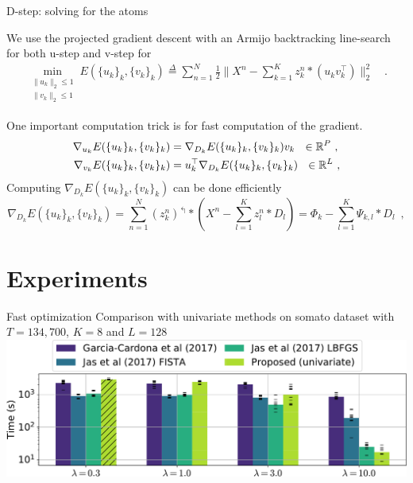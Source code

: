 \documentclass{beamer}
\begin{document}
\begin{frame}{D-step: solving for the atoms}

	We use the projected gradient descent with an Armijo backtracking line-search \cite{Wright1999} for both u-step and v-step for
	\begin{equation}
		\begin{split}
			\min_{\substack{\|u_{k}\|_2 \leq 1\\\|v_{k}\|_2 \leq 1}} E(\{u_k\}_k, \{v_k\}_k) \overset{\Delta}{=} \sum_{n=1}^N\frac{1}{2}\|X^n - \sum_{k=1}^K z^n_k * (u_k^{ }  v_k^\top) \|_{2}^{2} \hspace{6pt}
			\enspace .
		\end{split}
	\end{equation}
	
	One important computation trick is for fast computation of the gradient.
	\[
	\begin{split}
		\nabla_{u_k} E(\{u_k\}_k, \{v_k\}_k) &=  \nabla_{D_k}E(\{u_k\}_k, \{v_k\}_k) v_k ~~ \in \Rset^{P}~,\\
		\nabla_{v_k} E(\{u_k\}_k, \{v_k\}_k) &=  u_k^\top \nabla_{D_k} E(\{u_k\}_k, \{v_k\}_k)  ~~ \in \Rset^L~,
	\end{split}
	\]
	Computing $\nabla_{D_k} E(\{u_k\}_k, \{v_k\}_k)$ can be done efficiently
	\[
	\nabla_{D_{k}} E(\{u_k\}_k, \{v_k\}_k) =  \sum_{n=1}^N (z_k^n)^\Lsh * \left(X^n - \sum_{l=1}^K z^n_l * D_l\right)
	=  \Phi_k - \sum_{l=1}^K \Psi_{k, l} *  D_l \enspace ,
	\]

\end{frame}

\section{Experiments}

\begin{frame}{Fast optimization}
Comparison with univariate methods on somato dataset with $T=134,700$, $K=8$ and $L=128$\\[1em]
\includegraphics[width=\textwidth]{all_last_0001_T_13470_P1_K8_L128}
\end{frame}
\end{document}
